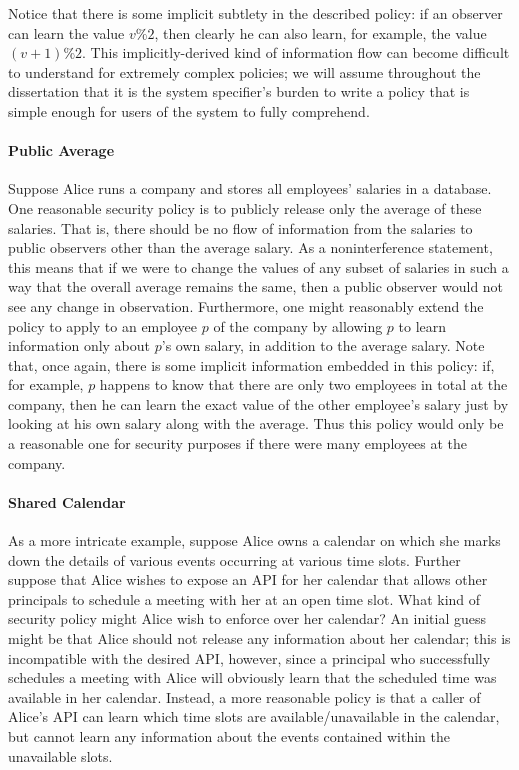 Notice that
there is some implicit subtlety in the described policy: if an observer can 
learn the value $v\%2$, then clearly he can also learn, for example, the value 
$(v+1)\%2$. This implicitly-derived kind of information flow can become difficult
to understand for extremely complex policies; we will assume throughout the
dissertation that it is the system specifier's burden to write a policy that
is simple enough for users of the system to fully comprehend.

\paragraph{Public Average}
Suppose Alice runs a company and stores all employees' salaries in a database.
One reasonable security policy is to publicly release only the average of these 
salaries. That is, there should be no flow of information from the salaries to 
public observers other than the average salary. As a noninterference statement,
this means that if we were to change the values of any subset of salaries in
such a way that the overall average remains the same, then a public observer
would not see any change in observation. Furthermore, one might reasonably
extend the policy to apply to an employee $p$ of the company by allowing $p$
to learn information only about $p$'s own salary, in addition to the average
salary. Note that, once again, there is some implicit information embedded
in this policy: if, for example, $p$ happens to know that there are only two employees in
total at the company, then he can learn the exact value of the other employee's
salary just by looking at his own salary along with the average. Thus this
policy would only be a reasonable one for security purposes if there were many 
employees at the company.

\paragraph{Shared Calendar}
As a more intricate example, suppose Alice owns a calendar on which she
marks down the details of various events occurring at various time slots.
Further suppose that Alice wishes to expose an API for her calendar that
allows other principals to schedule a meeting with her at an open time slot.
What kind of security policy might Alice wish to enforce over her calendar?
An initial guess might be that Alice should not release any information
about her calendar; this is incompatible with the desired API, however, since
a principal who successfully schedules a meeting with Alice will obviously
learn that the scheduled time was available in her calendar. Instead, a
more reasonable policy is that a caller of Alice's API can learn which time
slots are available/unavailable in the calendar, but cannot learn any 
information about the events contained within the unavailable slots.

